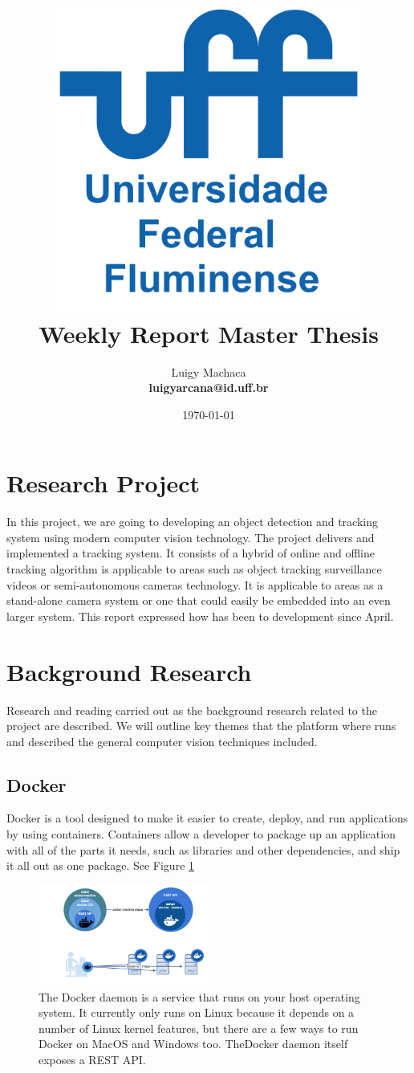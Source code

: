 \documentclass[a4paper]{article}
\title{
    \vspace*{1in}
    \includegraphics[width=3.95in]{figures/uff-logo.png} \\
    \vspace*{1.2in}
    \textbf{\huge Weekly Report Master Thesis}
    \vspace{0.2in}\\
    \vspace{0.2in}
}
\author{Luigy Machaca \\
    \textbf{luigyarcana@id.uff.br} \\
}
\date{\today}
\begin{document}
\maketitle
\setcounter{page}{0}
\thispagestyle{empty}
\newpage


\section{Research Project}
In this project, we are going to developing an object detection and tracking system using modern computer vision technology. The project delivers and implemented a tracking system. It consists of a hybrid of online and offline tracking algorithm is applicable to areas such as object tracking surveillance videos or semi-autonomous cameras technology\cite{re3}. It is applicable to areas as a stand-alone camera system or one that could easily be embedded into an even larger system. This report expressed how has been to development since April.

\section{ Background Research  }

Research and reading carried out as the background research related to the project are described. We will outline key themes that the platform where runs and described the general computer vision techniques included.

\subsection{Docker}
Docker is a tool designed to make it easier to create, deploy, and run applications by using containers. Containers allow a developer to package up an application with all of the parts it needs, such as libraries and other dependencies, and ship it all out as one package. See Figure \ref{fig:docker} 


\begin{figure}[hb]
    \centering
    \includegraphics[width=0.5\textwidth]{figures/docker.png}
    \caption{The Docker daemon is a service that runs on your host operating system. It currently only runs on Linux because it depends on a number of Linux kernel features, but there are a few ways to run Docker on MacOS and Windows too. TheDocker daemon itself exposes a REST API.}
    \label{fig:docker}
\end{figure}
\end{document}
